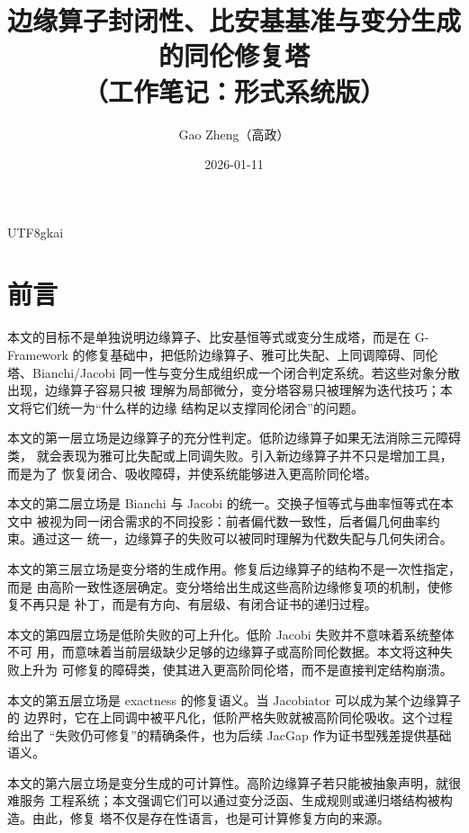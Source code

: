 \documentclass[12pt]{article}
\newcommand{\GFramework}{\textsf{G-Framework}}
\begin{document}
\begin{CJK*}{UTF8}{gkai}

\title{边缘算子封闭性、比安基基准与变分生成的同伦修复塔\\（工作笔记：形式系统版）}
\author{Gao Zheng（高政）}
\date{2026-01-11}
\maketitle

\section*{前言}

本文的目标不是单独说明边缘算子、比安基恒等式或变分生成塔，而是在 \GFramework{}
的修复基础中，把低阶边缘算子、雅可比失配、上同调障碍、同伦塔、Bianchi/Jacobi
同一性与变分生成组织成一个闭合判定系统。若这些对象分散出现，边缘算子容易只被
理解为局部微分，变分塔容易只被理解为迭代技巧；本文将它们统一为“什么样的边缘
结构足以支撑同伦闭合”的问题。

本文的第一层立场是边缘算子的充分性判定。低阶边缘算子如果无法消除三元障碍类，
就会表现为雅可比失配或上同调失败。引入新边缘算子并不只是增加工具，而是为了
恢复闭合、吸收障碍，并使系统能够进入更高阶同伦塔。

本文的第二层立场是 Bianchi 与 Jacobi 的统一。交换子恒等式与曲率恒等式在本文中
被视为同一闭合需求的不同投影：前者偏代数一致性，后者偏几何曲率约束。通过这一
统一，边缘算子的失败可以被同时理解为代数失配与几何失闭合。

本文的第三层立场是变分塔的生成作用。修复后边缘算子的结构不是一次性指定，而是
由高阶一致性逐层确定。变分塔给出生成这些高阶边缘修复项的机制，使修复不再只是
补丁，而是有方向、有层级、有闭合证书的递归过程。

本文的第四层立场是低阶失败的可上升化。低阶 Jacobi 失败并不意味着系统整体不可
用，而意味着当前层级缺少足够的边缘算子或高阶同伦数据。本文将这种失败上升为
可修复的障碍类，使其进入更高阶同伦塔，而不是直接判定结构崩溃。

本文的第五层立场是 exactness 的修复语义。当 Jacobiator 可以成为某个边缘算子的
边界时，它在上同调中被平凡化，低阶严格失败就被高阶同伦吸收。这个过程给出了
“失败仍可修复”的精确条件，也为后续 JacGap 作为证书型残差提供基础语义。

本文的第六层立场是变分生成的可计算性。高阶边缘算子若只能被抽象声明，就很难服务
工程系统；本文强调它们可以通过变分泛函、生成规则或递归塔结构被构造。由此，修复
塔不仅是存在性语言，也是可计算修复方向的来源。


\end{CJK*}
\end{document}
